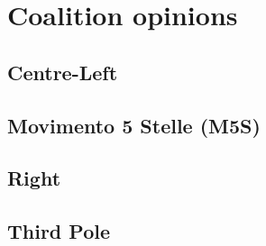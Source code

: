 \section{Coalition opinions}
\label{app:coalition_opinions}

\subsection{Centre-Left}


\subsection{Movimento 5 Stelle (M5S)}


\subsection{Right}


\subsection{Third Pole}




